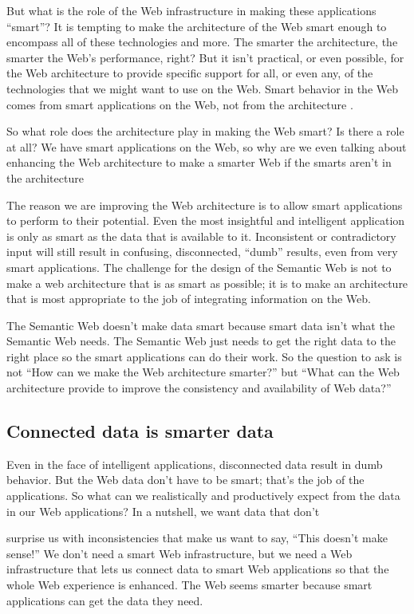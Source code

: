 But what is the role of the Web infrastructure in making these
applications ``smart''? It is tempting to make the architecture of the
Web smart enough to encompass all of these technologies and more. The
smarter the architecture, the smarter the Web's performance, right? But
it isn't practical, or even possible, for the Web architecture to
provide specific support for all, or even any, of the technologies that
we might want to use on the Web. Smart behavior in the Web comes from
smart applications on the Web, not from the architecture .

So what role does the architecture play in making the Web smart? Is
there a role at all? We have smart applications on the Web, so why are
we even talking about enhancing the Web architecture to make a smarter
Web if the smarts aren't in the architecture

The reason we are improving the Web architecture is to allow smart
applications to perform to their potential. Even the most insightful and
intelligent application is only as smart as the data that is available
to it. Inconsistent or contradictory input will still result in
confusing, disconnected, ``dumb'' results, even from very smart
applications. The challenge for the design of the Semantic Web is not to
make a web architecture that is as smart as possible; it is to make an
architecture that is most appropriate to the job of integrating
information on the Web.

The Semantic Web doesn't make data smart because smart data isn't what
the Semantic Web needs. The Semantic Web just needs to get the right
data to the right place so the smart applications can do their work. So
the question to ask is not ``How can we make the Web architecture
smarter?'' but ``What can the Web architecture provide to improve the
consistency and availability of Web data?''

\subsection{Connected data is smarter data}

Even in the face of intelligent applications, disconnected data result
in dumb behavior. But the Web data don't have to be smart; that's the
job of the applications. So what can we realistically and productively
expect from the data in our Web applications? In a nutshell, we want
data that don't

surprise us with inconsistencies that make us want to say, ``This
doesn't make sense!'' We don't need a smart Web infrastructure, but we
need a Web infrastructure that lets us connect data to smart Web
applications so that the whole Web experience is enhanced. The Web seems
smarter because smart applications can get the data they need.

